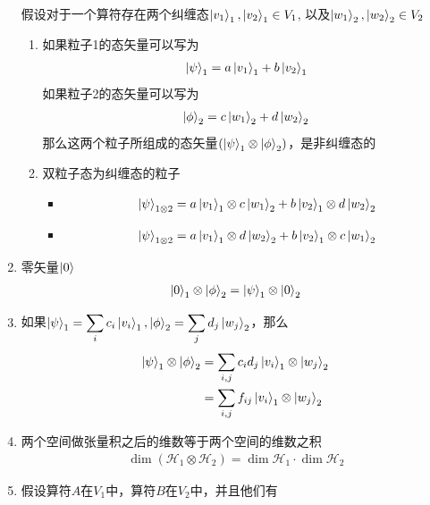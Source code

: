 \documentclass{article}
\begin{document}
\begin{enumerate}
    假设对于一个算符存在两个纠缠态$\ket{v_1}_1,\ket{v_2}_1\in V_1$,
    以及$\ket{w_1}_2,\ket{w_2}_2\in V_2$
    \begin{enumerate}
        \item 如果粒子1的态矢量可以写为
        \begin{align*}
            \ket{\psi}_1=a\ket{v_1}_1+b\ket{v_2}_1
        \end{align*}
        如果粒子2的态矢量可以写为
        \begin{align*}
            \ket{\phi}_2=c\ket{w_1}_2+d\ket{w_2}_2
        \end{align*}
        那么这两个粒子所组成的态矢量$(\ket{\psi}_1\otimes\ket{\phi}_2)$，是非纠缠态的
        \item 双粒子态为纠缠态的粒子
        \begin{itemize}
            \item 
            \begin{align*}
                \ket{\psi}_{1\otimes 2}=a\ket{v_1}_1\otimes c\ket{w_1}_2+b\ket{v_2}_1\otimes d\ket{w_2}_2
            \end{align*}
            \item 
            \begin{align*}
                \ket{\psi}_{1\otimes 2}=a\ket{v_1}_1\otimes d\ket{w_2}_2 +b\ket{v_2}_1\otimes c\ket{w_1}_2
            \end{align*}
        \end{itemize} 
    \end{enumerate}
    \item 零矢量$\ket{0}$
    \begin{align*}
        \ket{0}_1\otimes\ket{\phi}_2=\ket{\psi}_1\otimes\ket{0}_2
    \end{align*}
    \item 如果$\displaystyle\ket{\psi}_1=\sum_{i}c_i\ket{v_i}_1,\ket{\phi}_2=\sum_{j}d_j\ket{w_j}_2$，那么
    \begin{align*}
        \ket{\psi}_1\otimes\ket{\phi}_2&=\sum_{i,j}c_id_j\ket{v_i}_1\otimes\ket{w_j}_2\\
        &= \sum_{i,j}f_{ij}\ket{v_i}_1\otimes\ket{w_j}_2
    \end{align*}
    \item 两个空间做张量积之后的维数等于两个空间的维数之积
    \begin{align*}
        \dim{}(\mathcal{H}_1\otimes\mathcal{H}_2)=\dim{\mathcal{H}_1}\cdot\dim{\mathcal{H}_2}
    \end{align*}
    \item 假设算符$A$在$V_1$中，算符$B$在$V_2$中，并且他们有

\end{enumerate}
\end{document}
